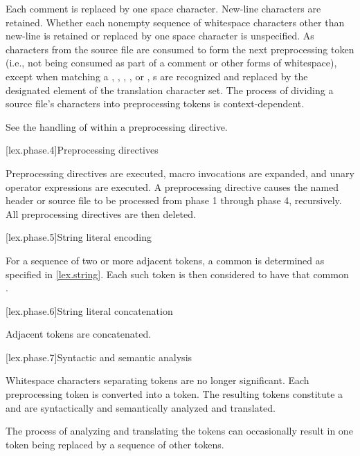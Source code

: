 \pnum
Each comment is replaced by one space character. New-line characters are
retained. Whether each nonempty sequence of whitespace characters other
than new-line is retained or replaced by one space character is
unspecified.
As characters from the source file are consumed
to form the next preprocessing token
(i.e., not being consumed as part of a comment or other forms of whitespace),
except when matching a
,
,
,
, or
,
s are recognized and
replaced by the designated element of the translation character set.
The process of dividing a source file's
characters into preprocessing tokens is context-dependent.
\begin{example}
See the handling of \tcode{<} within a  preprocessing
directive.
\end{example}

[lex.phase.4]{Preprocessing directives}%

\pnum
Preprocessing directives are executed, macro invocations are
expanded, and  unary operator expressions are executed.
A  preprocessing directive causes the named header or
source file to be processed from phase 1 through phase 4, recursively.
All preprocessing directives are then deleted.

[lex.phase.5]{String literal encoding}%

\pnum
For a sequence of two or more adjacent  tokens,
a common  is determined
as specified in \ref{lex.string}.
Each such  token is then considered to have
that common .

[lex.phase.6]{String literal concatenation}%

\pnum
Adjacent  tokens are concatenated.

[lex.phase.7]{Syntactic and semantic analysis}%

\pnum
Whitespace characters separating tokens are no longer
significant. Each preprocessing token is converted into a
token. The resulting tokens
constitute a  and
are syntactically and semantically analyzed and translated.
\begin{note}
The process of analyzing and translating the tokens can occasionally
result in one token being replaced by a sequence of other
tokens.
\end{note}

